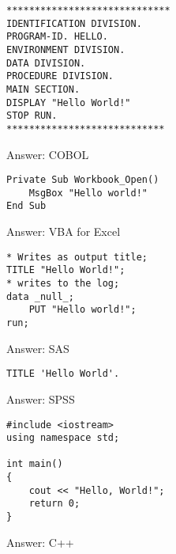 \documentclass{article}
\begin{document}
\hrulefill
\begin{multicols}{2}


\begin{verbatim}
*****************************
IDENTIFICATION DIVISION.
PROGRAM-ID. HELLO.
ENVIRONMENT DIVISION.
DATA DIVISION.
PROCEDURE DIVISION.
MAIN SECTION.
DISPLAY "Hello World!"
STOP RUN.
****************************
\end{verbatim}

\columnbreak

\begin{flushright}
    Answer: COBOL
\end{flushright}

\end{multicols}

\hrulefill
\begin{multicols}{2}


\begin{verbatim}
Private Sub Workbook_Open()
    MsgBox "Hello world!"
End Sub
\end{verbatim}

\columnbreak

\begin{flushright}
    Answer: VBA for Excel
\end{flushright}

\end{multicols}

\hrulefill
\begin{multicols}{2}


\begin{verbatim}
* Writes as output title;
TITLE "Hello World!";
* writes to the log;
data _null_;
    PUT "Hello world!";
run;
\end{verbatim}

\columnbreak

\begin{flushright}
    Answer: SAS
\end{flushright}

\end{multicols}

\hrulefill
\begin{multicols}{2}


\begin{verbatim}
TITLE 'Hello World'.
\end{verbatim}

\columnbreak

\begin{flushright}
    Answer: SPSS
\end{flushright}

\end{multicols}


\hrulefill
\begin{multicols}{2}


\begin{verbatim}
#include <iostream>
using namespace std;

int main() 
{
    cout << "Hello, World!";
    return 0;
}
\end{verbatim}

\columnbreak

\begin{flushright}
    Answer: C++
\end{flushright}

\end{multicols}
\end{document}
